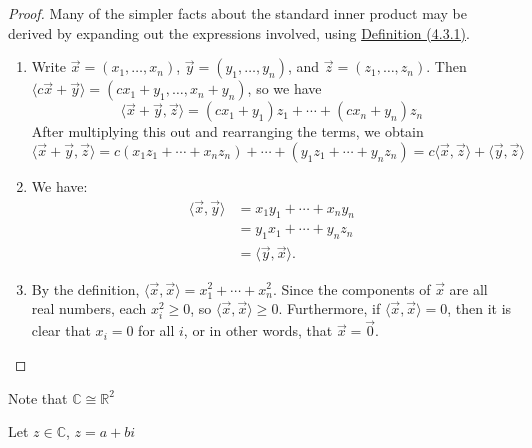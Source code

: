 \documentclass[11pt,fleqn]{book} %
\begin{document}
\begin{proof}
    Many of the simpler facts about the standard inner product may be derived by expanding out the expressions involved, using \hyperref[Def4_3_1]{Definition (4.3.1)}.

    \begin{enumerate}[label=\alph*)]
        \item Write $\vec{x} = (x_1, \dots, x_n)$, $\vec{y} = (y_1, \dots, y_n)$, and $\vec{z} = (z_1, \dots, z_n)$. Then $\langle c\vec{x} + \vec{y} \rangle = (cx_1 + y_1, \dots, x_n + y_n)$, so we have $$\langle \vec{x} + \vec{y}, \vec{z} \rangle = (cx_1 + y_1)z_1 + \cdots + (cx_n + y_n)z_n$$ After multiplying this out and rearranging the terms, we obtain $$\langle \vec{x} + \vec{y}, \vec{z} \rangle = c(x_1z_1 + \cdots + x_nz_n)+ \cdots + (y_1z_1+ \cdots + y_nz_n) = c \langle \vec{x}, \vec{z} \rangle + \langle \vec{y}, \vec{z} \rangle$$

        \item We have:
        \vspace{-0.45cm}
        \begin{align*}
            \langle \vec{x}, \vec{y} \rangle
            &= x_1y_1 + \cdots + x_ny_n
            \\
            &= y_1x_1 + \cdots + y_nz_n
            \\
            &= \langle \vec{y}, \vec{x} \rangle.
        \end{align*}

        \item By the definition, $\langle \vec{x}, \vec{x} \rangle = x_1^2 + \cdots + x_n^2$. Since the components of $\vec{x}$ are all real numbers, each $x_i^2 \ge 0$, so $\langle \vec{x}, \vec{x} \rangle \ge 0$. Furthermore, if $\langle \vec{x}, \vec{x} \rangle = 0$, then it is clear that $x_i = 0$ for all $i$, or in other words, that $\vec{x} = \vec{0}$.
    \end{enumerate}
\end{proof}

Note that $\mathbb{C} \cong \mathbb{R}^2$

Let $z \in \mathbb{C}$, $z = a + bi$
\end{document}
